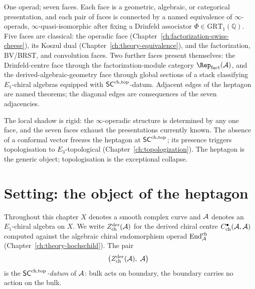 One operad; seven faces. Each face is a geometric, algebraic, or
categorical presentation, and each pair of faces is connected by a named
equivalence of $\infty$-operads, $\infty$-quasi-isomorphic after
fixing a Drinfeld associator $\Phi\in\mathrm{GRT}_1(\mathbb{Q})$.
Five faces are classical: the operadic face
(Chapter~\ref{ch:factorization-swiss-cheese}), its Koszul dual
(Chapter~\ref{ch:theory-equivalence}), and the factorization,
BV/BRST, and convolution faces. Two further faces present themselves:
the Drinfeld-centre face through the factorization-module category
$\Rep_{\mathrm{fact}}(\cA)$, and the derived-algebraic-geometry face
through global sections of a stack classifying $E_1$-chiral algebras
equipped with $\mathsf{SC}^{\mathrm{ch},\mathrm{top}}$-datum.
Adjacent edges of the heptagon are named theorems; the diagonal edges
are consequences of the seven adjacencies.

The local shadow is rigid: the $\infty$-operadic structure is
determined by any one face, and the seven faces exhaust the
presentations currently known. The absence of a conformal vector
freezes the heptagon at $\mathsf{SC}^{\mathrm{ch},\mathrm{top}}$; its presence triggers
topologisation to $E_3$-topological (Chapter~\ref{ch:topologization}).
The heptagon is the generic object; topologisation is the exceptional
collapse.

\section{Setting: the object of the heptagon}
\label{sec:heptagon-setting}

Throughout this chapter $X$ denotes a smooth complex curve and $\mathcal{A}$
denotes an $E_1$-chiral algebra on $X$. We write $Z^{\mathrm{der}}_{\mathrm{ch}}(\mathcal{A})$
for the derived chiral centre $C^{\bullet}_{\mathrm{ch}}(\mathcal{A},\mathcal{A})$
computed against the algebraic chiral endomorphism operad
$\mathrm{End}^{\mathrm{ch}}_{\mathcal{A}}$ (Chapter~\ref{ch:theory-hochschild}). The pair
\begin{equation}
 \label{eq:heptagon-pair}
 \bigl(Z^{\mathrm{der}}_{\mathrm{ch}}(\mathcal{A}),\;\mathcal{A}\bigr)
\end{equation}
is the \emph{$\mathsf{SC}^{\mathrm{ch},\mathrm{top}}$-datum} of $\mathcal{A}$: bulk acts on boundary, the
boundary carries no action on the bulk.

